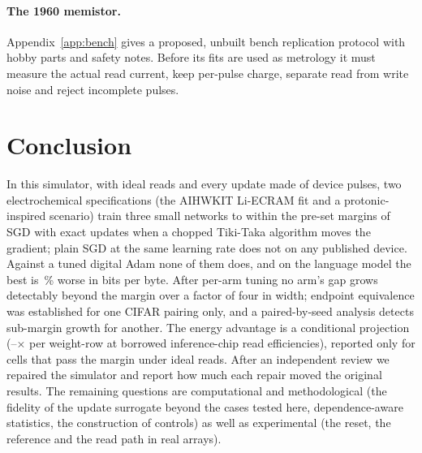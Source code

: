 \paragraph{The 1960 memistor.} Appendix~\ref{app:bench} gives a proposed, unbuilt bench replication protocol with hobby parts and
safety notes. Before its fits are used as metrology it must measure the actual read current, keep per-pulse charge, separate
read from write noise and reject incomplete pulses.

\section{Conclusion}
In this simulator, with ideal reads and every update made of device pulses, two electrochemical specifications (the AIHWKIT
Li-ECRAM fit and a protonic-inspired scenario) train three small networks to within the pre-set margins of SGD with exact updates
when a chopped Tiki-Taka algorithm moves the gradient; plain SGD at the same learning rate does not on any published device. Against
a tuned digital Adam none of them does, and on the language model the best is \RVLmAdamBestGap\,\% worse in bits per byte. After
per-arm tuning no arm's gap grows detectably beyond the margin over a factor of four in width; endpoint equivalence was established
for one CIFAR pairing only, and a paired-by-seed analysis detects sub-margin growth for another. The energy advantage is a
conditional projection (\RVenSysMin--\RVenChipMax$\times$ per weight-row at borrowed inference-chip read efficiencies), reported
only for cells that pass the margin under ideal reads. After an independent review we repaired the simulator and report how much each repair moved the
original results. The remaining questions are computational and methodological (the fidelity of the update surrogate beyond the cases tested
here, dependence-aware statistics, the construction of controls) as well as experimental (the reset, the reference and the read
path in real arrays).
